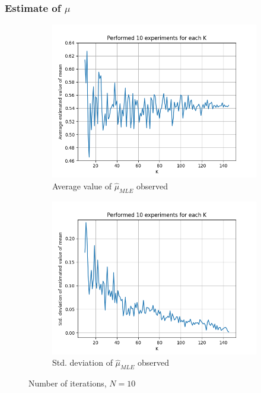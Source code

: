 \documentclass[fleqn, 11pt]{article}
\begin{document}
\subsubsection{Estimate of $\mu$}
\begin{figure}[H]
    \centering
    \begin{subfigure}[H]{0.49\textwidth}
        \centering
        \includegraphics[width=\textwidth]{P1_mu/avgs_10.png}
        \caption[]{Average value of $\hat{\mu}_{MLE}$ observed}
    \end{subfigure}
    \begin{subfigure}[H]{0.49\textwidth}
        \centering
        \includegraphics[width=\textwidth]{P1_mu/stds_10.png}
        \caption[]{Std. deviation of $\hat{\mu}_{MLE}$ observed}
    \end{subfigure}
    \caption{Number of iterations, $N = 10$}
\end{figure}
\end{document}
